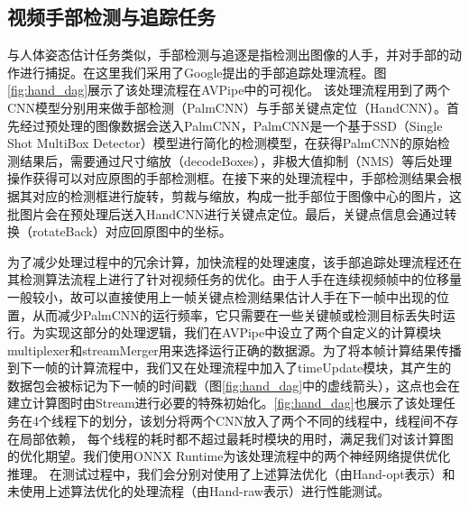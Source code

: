 \subsection{视频手部检测与追踪任务}
与人体姿态估计任务类似，手部检测与追逐是指检测出图像的人手，并对手部的动作进行捕捉。在这里我们采用了Google提出的手部追踪处理流程\cite{mediapipe_hand}。图\ref{fig:hand_dag}展示了该处理流程在AVPipe中的可视化。
该处理流程用到了两个CNN模型分别用来做手部检测（PalmCNN）与手部关键点定位（HandCNN）。首先经过预处理的图像数据会送入PalmCNN，PalmCNN是一个基于SSD（Single Shot MultiBox Detector）\cite{liu2016ssd}模型进行简化的检测模型，在获得PalmCNN的原始检测结果后，需要通过尺寸缩放（decodeBoxes），非极大值抑制（NMS）等后处理操作获得可以对应原图的手部检测框。在接下来的处理流程中，手部检测结果会根据其对应的检测框进行旋转，剪裁与缩放，构成一批手部位于图像中心的图片，这批图片会在预处理后送入HandCNN进行关键点定位。最后，关键点信息会通过转换（rotateBack）对应回原图中的坐标。\par
为了减少处理过程中的冗余计算，加快流程的处理速度，该手部追踪处理流程还在其检测算法流程上进行了针对视频任务的优化。由于人手在连续视频帧中的位移量一般较小，故可以直接使用上一帧关键点检测结果估计人手在下一帧中出现的位置，从而减少PalmCNN的运行频率，它只需要在一些关键帧或检测目标丢失时运行。为实现这部分的处理逻辑，我们在AVPipe中设立了两个自定义的计算模块multiplexer和streamMerger用来选择运行正确的数据源。为了将本帧计算结果传播到下一帧的计算流程中，我们又在处理流程中加入了timeUpdate模块，其产生的数据包会被标记为下一帧的时间戳（图\ref{fig:hand_dag}中的虚线箭头），这点也会在建立计算图时由Stream进行必要的特殊初始化。\ref{fig:hand_dag}也展示了该处理任务在4个线程下的划分，该划分将两个CNN放入了两个不同的线程中，线程间不存在局部依赖，
每个线程的耗时都不超过最耗时模块的用时，满足我们对该计算图的优化期望。我们使用ONNX Runtime为该处理流程中的两个神经网络提供优化推理。
在测试过程中，我们会分别对使用了上述算法优化（由Hand-opt表示）和未使用上述算法优化的处理流程（由Hand-raw表示）进行性能测试。

